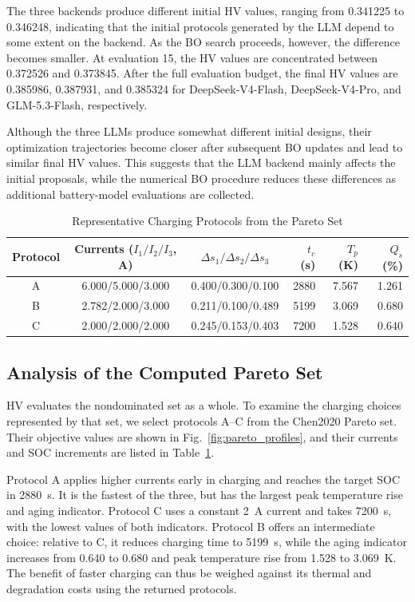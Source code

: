 \documentclass[journal]{IEEEtran}
\begin{document}
The three backends produce different initial HV values, ranging from
0.341225 to 0.346248, indicating that the initial protocols generated by
the LLM depend to some extent on the backend. As the BO search proceeds,
however, the difference becomes smaller. At evaluation 15, the HV values
are concentrated between 0.372526 and 0.373845. After the full evaluation
budget, the final HV values are 0.385986, 0.387931, and 0.385324 for
DeepSeek-V4-Flash, DeepSeek-V4-Pro, and GLM-5.3-Flash, respectively.

Although the three LLMs produce somewhat different initial designs, their
optimization trajectories become closer after subsequent BO updates and
lead to similar final HV values. This suggests that the LLM backend mainly
affects the initial proposals, while the numerical BO procedure reduces
these differences as additional battery-model evaluations are collected.

\begin{table}[!t]
\caption{Representative Charging Protocols from the Pareto Set}
\label{tab:representative_protocols}
\centering
\scriptsize
\setlength{\tabcolsep}{2.5pt}
\begin{tabular}{@{}c c c r r r@{}}
\toprule
Protocol & Currents ($I_1/I_2/I_3$, A) & $\Delta s_1/\Delta s_2/\Delta s_3$ &
$t_c$ (s) & $T_p$ (K) & $Q_s$ (\%) \\
\midrule
A & 6.000/5.000/3.000 & 0.400/0.300/0.100 & 2880 & 7.567 & 1.261 \\
B & 2.782/2.000/3.000 & 0.211/0.100/0.489 & 5199 & 3.069 & 0.680 \\
C & 2.000/2.000/2.000 & 0.245/0.153/0.403 & 7200 & 1.528 & 0.640 \\
\bottomrule
\end{tabular}
\end{table}

\subsection{Analysis of the Computed Pareto Set}

HV evaluates the nondominated set as a whole. To examine the charging choices
represented by that set, we select protocols A--C from the Chen2020 Pareto
set. Their objective values are shown in Fig.~\ref{fig:pareto_profiles}, and
their currents and SOC increments are listed in
Table~\ref{tab:representative_protocols}.

Protocol A applies higher currents early in charging and reaches the target
SOC in 2880~s. It is the fastest of the three, but has the largest peak
temperature rise and aging indicator. Protocol C uses a constant 2~A current
and takes 7200~s, with the lowest values of both indicators. Protocol B offers
an intermediate choice: relative to C, it reduces charging time to 5199~s,
while the aging indicator increases from 0.640 to 0.680 and peak temperature
rise from 1.528 to 3.069~K. The benefit of faster charging can thus be weighed
against its thermal and degradation costs using the returned protocols.
\end{document}
